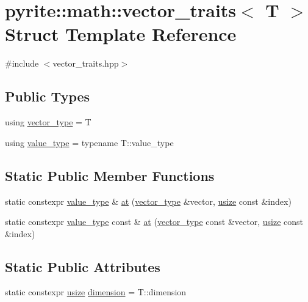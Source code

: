 \hypertarget{structpyrite_1_1math_1_1vector__traits}{}\section{pyrite\+:\+:math\+:\+:vector\+\_\+traits$<$ T $>$ Struct Template Reference}
\label{structpyrite_1_1math_1_1vector__traits}


{\ttfamily \#include $<$vector\+\_\+traits.\+hpp$>$}

\subsection*{Public Types}
\begin{DoxyCompactItemize}
\item 
using \mbox{\hyperlink{structpyrite_1_1math_1_1vector__traits_abae24d3748d9ac5db627b6288822400f}{vector\+\_\+type}} = T
\item 
using \mbox{\hyperlink{structpyrite_1_1math_1_1vector__traits_a727892393454b3e72d96a1f3c15b37e2}{value\+\_\+type}} = typename T\+::value\+\_\+type
\end{DoxyCompactItemize}
\subsection*{Static Public Member Functions}
\begin{DoxyCompactItemize}
\item 
static constexpr \mbox{\hyperlink{structpyrite_1_1math_1_1vector__traits_a727892393454b3e72d96a1f3c15b37e2}{value\+\_\+type}} \& \mbox{\hyperlink{structpyrite_1_1math_1_1vector__traits_a4eb1d1180c18fd414ed2f080322f2533}{at}} (\mbox{\hyperlink{structpyrite_1_1math_1_1vector__traits_abae24d3748d9ac5db627b6288822400f}{vector\+\_\+type}} \&vector, \mbox{\hyperlink{type_8hpp_a3984e6dc0a53b867e054e8447f2f2be1}{usize}} const \&index)
\item 
static constexpr \mbox{\hyperlink{structpyrite_1_1math_1_1vector__traits_a727892393454b3e72d96a1f3c15b37e2}{value\+\_\+type}} const  \& \mbox{\hyperlink{structpyrite_1_1math_1_1vector__traits_af292435739fbef535f287c658525376b}{at}} (\mbox{\hyperlink{structpyrite_1_1math_1_1vector__traits_abae24d3748d9ac5db627b6288822400f}{vector\+\_\+type}} const \&vector, \mbox{\hyperlink{type_8hpp_a3984e6dc0a53b867e054e8447f2f2be1}{usize}} const \&index)
\end{DoxyCompactItemize}
\subsection*{Static Public Attributes}
\begin{DoxyCompactItemize}
\item 
static constexpr \mbox{\hyperlink{type_8hpp_a3984e6dc0a53b867e054e8447f2f2be1}{usize}} \mbox{\hyperlink{structpyrite_1_1math_1_1vector__traits_a79d22d82f3fc84d91df6128e70c61382}{dimension}} = T\+::dimension
\end{DoxyCompactItemize}


